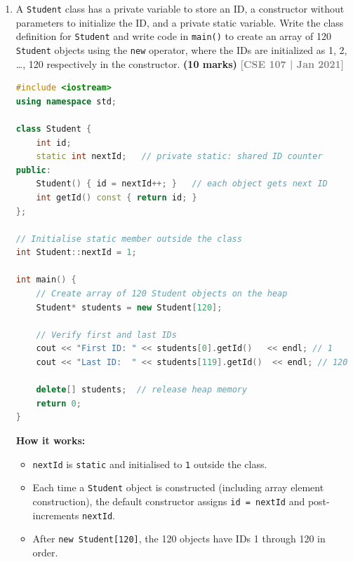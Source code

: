 \documentclass[12pt,a3paper]{article}
\newcommand{\yr}[1]{\hfill\textcolor{gray}{\small\textbf{[#1]}}}
\newcommand{\mk}[1]{\textcolor{orange!70!black}{\small\textbf{(#1 marks)}}}
\begin{document}
\begin{enumerate}
\item A \texttt{Student} class has a private variable to store an ID, a constructor without parameters to initialize the ID, and a private static variable. Write the class definition for \texttt{Student} and write code in \texttt{main()} to create an array of 120 \texttt{Student} objects using the \texttt{new} operator, where the IDs are initialized as 1, 2, \ldots, 120 respectively in the constructor. \mk{10}
\yr{CSE 107 | Jan 2021}

\begin{tcolorbox}[enhanced,breakable,ansbox,colback=cB!4,colframe=cB,
  boxrule=0.8pt,arc=5pt,
  title={\textbf{Answer}},fonttitle=\bfseries\color{white},colbacktitle=cB]

\begin{lstlisting}[language=C++]
#include <iostream>
using namespace std;

class Student {
    int id;
    static int nextId;   // private static: shared ID counter
public:
    Student() { id = nextId++; }   // each object gets next ID
    int getId() const { return id; }
};

// Initialise static member outside the class
int Student::nextId = 1;

int main() {
    // Create array of 120 Student objects on the heap
    Student* students = new Student[120];

    // Verify first and last IDs
    cout << "First ID: " << students[0].getId()   << endl; // 1
    cout << "Last ID:  " << students[119].getId()  << endl; // 120

    delete[] students;  // release heap memory
    return 0;
}
\end{lstlisting}

\textbf{How it works:}
\begin{itemize}[itemsep=2pt]
  \item \texttt{nextId} is \texttt{static} and initialised to
    \texttt{1} outside the class.
  \item Each time a \texttt{Student} object is constructed (including
    array element construction), the default constructor assigns
    \texttt{id = nextId} and post-increments \texttt{nextId}.
  \item After \texttt{new Student[120]}, the 120 objects have IDs
    1 through 120 in order.
\end{itemize}


\end{tcolorbox}
\end{enumerate}
\end{document}
